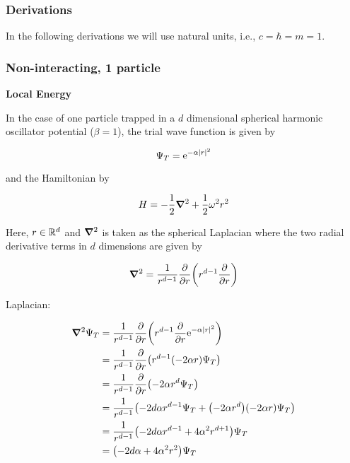\subsubsection*{Derivations}

In the following derivations we will use natural units, i.e., $c = \hbar = m = 1$.

\subsubsection*{Non-interacting, 1 particle}

\textbf{Local Energy}

In the case of one particle trapped in a $d$ dimensional spherical harmonic oscillator potential ($\beta = 1$), the trial wave function is given by 

\begin{equation*}
    \Psi_T = \mathrm{e}^{-\alpha \abs{r}^2}
\end{equation*}

and the Hamiltonian by

\begin{equation*}
    H = - \frac{1}{2} \grad^2 + \frac{1}{2} \omega^2 r^2
\end{equation*}

Here, $r \in \mathbb{R}^d$ and $\grad^2$ is taken as the spherical Laplacian where the two radial derivative terms in $d$ dimensions are given by

\begin{equation*}
    \grad^2 = \frac{1}{r^{d-1}} \pdv{r} \qty(r^{d-1} \pdv{r})
\end{equation*}

Laplacian: 

\begin{align*}
    \grad^2 \Psi_T &= \frac{1}{r^{d-1}} \pdv{r} \qty(r^{d-1} \pdv{r} \mathrm{e}^{-\alpha \abs{r}^2})
    \\
    &= \frac{1}{r^{d-1}} \pdv{r} \qty(r^{d-1} \qty(- 2 \alpha r) \Psi_T)
    \\
    &= \frac{1}{r^{d-1}} \pdv{r} \qty(- 2 \alpha r^d \Psi_T)
    \\
    &= \frac{1}{r^{d-1}} \qty(-2d\alpha r^{d-1} \Psi_T + \qty(- 2 \alpha r^d)\qty(- 2 \alpha r) \Psi_T )
    \\
    &= \frac{1}{r^{d-1}} \qty(-2d \alpha r^{d-1} + 4 \alpha^2 r^{d+1}) \Psi_T
    \\
    &= \qty(-2d \alpha + 4 \alpha^2 r^2) \Psi_T
\end{align*}

